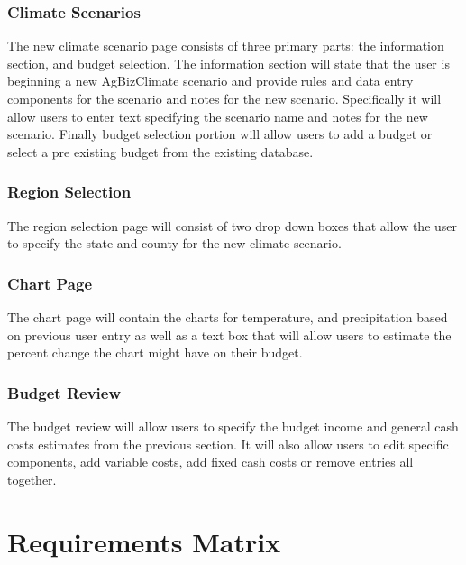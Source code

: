 \documentclass[onecolumn, draftclsnofoot,10pt, compsoc]{article}
\begin{document}
		\subsubsection{Climate Scenarios}
		The new climate scenario page consists of three primary parts: the information section, and budget selection. The information section will state that the user is beginning a new AgBizClimate scenario and provide rules and data entry components for the scenario and notes for the new scenario. Specifically it will allow users to enter text specifying the scenario name and notes for the new scenario. Finally budget selection portion will allow users to add a budget or select a pre existing budget from the existing database.
		\subsubsection{Region Selection}
		The region selection page will consist of two drop down boxes that allow the user to specify the state and county for the new climate scenario.
		\subsubsection{Chart Page}
		The chart page will contain the charts for temperature, and precipitation based on previous user entry as well as a text box that will allow users to estimate the percent change the chart might have on their budget.
		\subsubsection{Budget Review}
		The budget review will allow users to specify the budget income and general cash costs estimates from the previous section. It will also allow users to edit specific components, add variable costs, add fixed cash costs or remove entries all together.




\section{Requirements Matrix}
\end{document}
